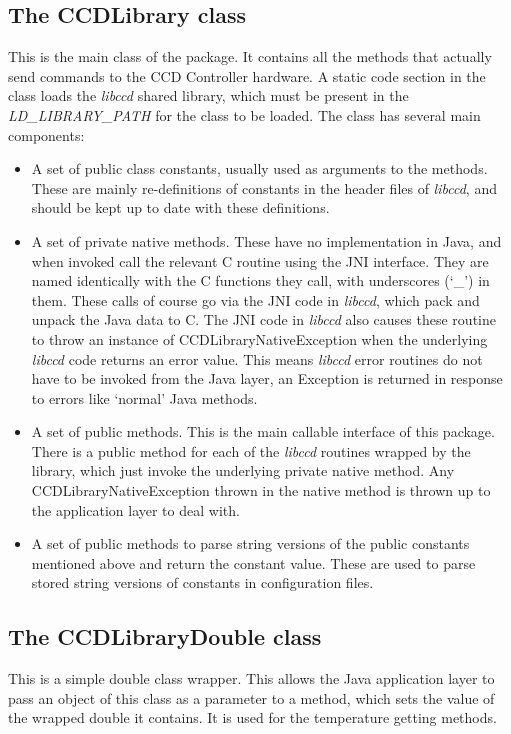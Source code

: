 \documentclass[10pt,a4paper]{article}
\begin{document}
\subsection{The CCDLibrary class}
This is the main class of the package. It contains all the methods that actually send commands to the CCD Controller
hardware. A static code section in the class loads the {\em libccd} shared library, which must be present in the
{\em LD\_LIBRARY\_PATH} for the class to be loaded.
The class has several main components:

\begin{itemize}
\item A set of public class constants, usually used as arguments to the methods. 
These are mainly re-definitions of constants
in the header files of {\em libccd}, and should be kept up to date with these definitions.
\item A set of private native methods. These have no implementation in Java, and when invoked call the
relevant C routine using the JNI interface. They are named identically with the C functions they call,
with underscores (`\_') in them. These calls of course go via the JNI code in {\em libccd}, which pack
and unpack the Java data to C. The JNI code in {\em libccd} also causes these routine to throw an instance of
CCDLibraryNativeException when the underlying {\em libccd} code returns an error value. This means {\em libccd}
error routines do not have to be invoked from the Java layer, an Exception is returned in response to errors
like `normal' Java methods.
\item A set of public methods. This is the main callable interface of this package. There is a public method
for each of the {\em libccd} routines wrapped by the library, which just invoke the underlying
private native method. Any CCDLibraryNativeException thrown in the native method is thrown up to the application
layer to deal with.
\item A set of public methods to parse string versions of the public constants mentioned above and return the
constant value. These are used to parse stored string versions of constants in configuration files.
\end{itemize}

\subsection{The CCDLibraryDouble class}
This is a simple double class wrapper. This allows the Java application layer to pass an object of this
class as a parameter to a method, which sets the value of the wrapped double it contains. It is used for
the temperature getting methods.
\end{document}
